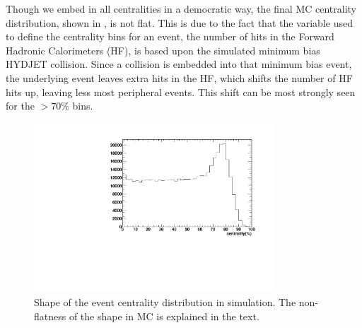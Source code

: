Though we embed \PgU in all centralities in a democratic way, the final MC centrality distribution, shown in  , is not flat. 
This is due to the fact that the variable used to define the centrality bins for an event, the number of hits in the Forward Hadronic Calorimeters (HF), is based upon the simulated minimum bias HYDJET \PbPb collision. Since a \pp collision is embedded into that minimum bias event, the underlying event leaves extra hits in the HF, which shifts the number of HF hits up, leaving less most peripheral events. This shift can be most strongly seen for the $>70\%$ bins. 

\begin{figure}[h]
  \begin{center}
    \includegraphics[angle=0,width=0.8\textwidth]{figures/efficiency/CentraltyPerc}\hspace{1em} 
    \caption{Shape of the event centrality distribution in simulation. 
 The non-flatness of the shape in MC is explained in the text.}
    \label{fig:Centrality}
  \end{center}
\end{figure}


